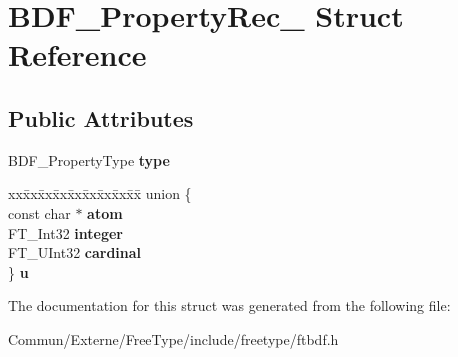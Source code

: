 \hypertarget{struct_b_d_f___property_rec__}{}\section{B\+D\+F\+\_\+\+Property\+Rec\+\_\+ Struct Reference}
\label{struct_b_d_f___property_rec__}
\subsection*{Public Attributes}
\begin{DoxyCompactItemize}
\item 
B\+D\+F\+\_\+\+Property\+Type {\bfseries type}\hypertarget{struct_b_d_f___property_rec___a88c19ee6f16bd1b36127f5f7d44a4e39}{}\label{struct_b_d_f___property_rec___a88c19ee6f16bd1b36127f5f7d44a4e39}

\item 
\begin{tabbing}
xx\=xx\=xx\=xx\=xx\=xx\=xx\=xx\=xx\=\kill
union \{\\
\>const char $\ast$ {\bfseries atom}\\
\>FT\_Int32 {\bfseries integer}\\
\>FT\_UInt32 {\bfseries cardinal}\\
\} {\bfseries u}\hypertarget{struct_b_d_f___property_rec___ad0b90c890b8517d70b0f21a063840fe4}{}\label{struct_b_d_f___property_rec___ad0b90c890b8517d70b0f21a063840fe4}
\\

\end{tabbing}\end{DoxyCompactItemize}


The documentation for this struct was generated from the following file\+:\begin{DoxyCompactItemize}
\item 
Commun/\+Externe/\+Free\+Type/include/freetype/ftbdf.\+h\end{DoxyCompactItemize}
